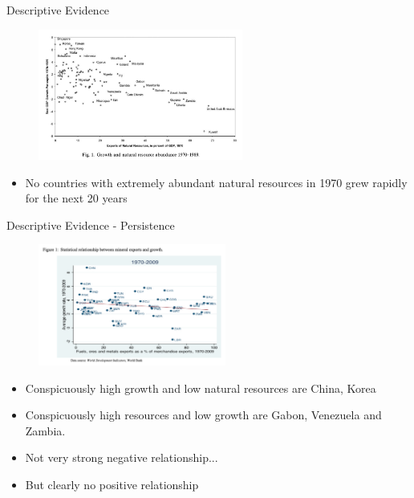 \documentclass[11pt,notes=hide,aspectratio=169,mathserif]{beamer}
\begin{document}
\begin{frame}{Descriptive Evidence}
\begin{figure}
\centering
\includegraphics[width=0.6\textwidth]{inputs/fig1.png}
\end{figure}
\begin{itemize}
\item No countries with extremely abundant natural resources in 1970 grew rapidly for the next 20 years
\end{itemize}
\end{frame}

\begin{frame}{Descriptive Evidence - Persistence}
\begin{figure}
\centering
\includegraphics[width=0.55\textwidth]{inputs/fig2.png}
\end{figure}
\begin{itemize}
\item Conspicuously high growth and low natural resources are China, Korea
\pause \item Conspicuously high resources and low growth are Gabon, Venezuela and Zambia. 
\pause \item Not very strong negative relationship...
\pause \item But clearly no positive relationship
\end{itemize}
\end{frame}
\end{document}
